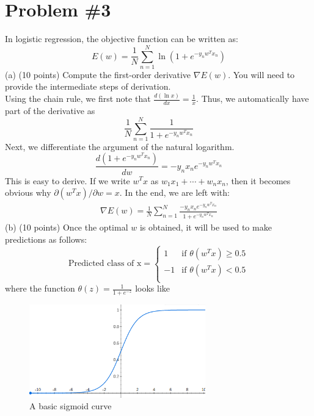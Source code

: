 \documentclass[12pt]{article}
\begin{document}
	\section*{Problem \#3}
	In logistic regression, the objective function can be written as:
	\begin{equation*}
	E(w)=\frac{1}{N} \sum_{n=1}^{N} \ln(1+e^{-y_nw^Tx_n})
	\end{equation*}
	(a) (10 points) Compute the first-order derivative $\nabla E(w)$. You will need to provide the intermediate steps of derivation.\\
	Using the chain rule, we first note that $\frac{d(\ln x)}{dx} = \frac{1}{x}$. Thus, we automatically have part of the derivative as
	\begin{equation*}
	\frac{1}{N} \sum_{n=1}^{N} \frac{1}{1+e^{-y_nw^Tx_n}}
	\end{equation*}
	Next, we differentiate the argument of the natural logarithm.
	\begin{equation*}
	\frac{d(1+e^{-y_nw^Tx_n})}{dw} = -y_n x_n e^{-y_nw^Tx_n}
	\end{equation*}
	This is easy to derive. If we write $w^T x$ as $w_1 x_1 + \cdots + w_n x_n$, then it becomes obvious why $\partial (w^T x) / \partial w = x$. In the end, we are left with:
	\begin{align*}
	\nabla E(w) = \frac{1}{N} \sum_{n=1}^{N} \frac{-y_n x_n e^{-y_nw^Tx_n}}{1+e^{-y_nw^Tx_n}}
	\end{align*}
	(b) (10 points) Once the optimal $w$ is obtained, it will be used to make predictions as follows:
	\begin{equation*}
	\text{Predicted class of x} = 
	\begin{cases}
	1 & \text{if } \theta(w^Tx) \ge 0.5 \\
	-1 & \text{if } \theta(w^Tx) < 0.5 \\
	\end{cases}
	\end{equation*}
	where the function $\theta(z) = \frac{1}{1+e^{-z}}$ looks like \\
	\begin{figure}[h]
		\begin{center}
			\includegraphics[width=3in]{sigmoid.png}
			\caption{A basic sigmoid curve}
			\label{fig:sigmoidEx}
		\end{center}
	\end{figure}
\end{document}
